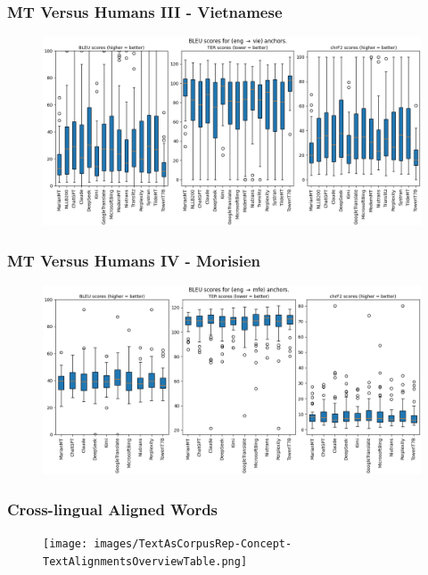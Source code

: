\documentclass[aspectratio=169]{beamer}
\begin{document}
\begin{frame}[fragile]
	\frametitle{MT Versus Humans III - Vietnamese}
    \begin{minipage}{1.0\textwidth}
    \begin{figure}
        \centering
        \includegraphics[width=1.0\textwidth]{images/eval-01-Vietnamese-Anchors.png} 
    \end{figure}
    \end{minipage}
\end{frame}

\begin{frame}[fragile]
	\frametitle{MT Versus Humans IV - Morisien}
    \begin{minipage}{1.0\textwidth}
    \begin{figure}
        \centering
        \includegraphics[width=1.0\textwidth]{images/eval-01-Morisien-Anchors.png} 
    \end{figure}
    \end{minipage}
\end{frame}

\begin{frame}[fragile]
	\frametitle{Cross-lingual Aligned Words}
    \begin{figure}
        \centering
        \texttt{[image: images/TextAsCorpusRep-Concept-TextAlignmentsOverviewTable.png]} 
    \end{figure}
\end{frame}
\end{document}
